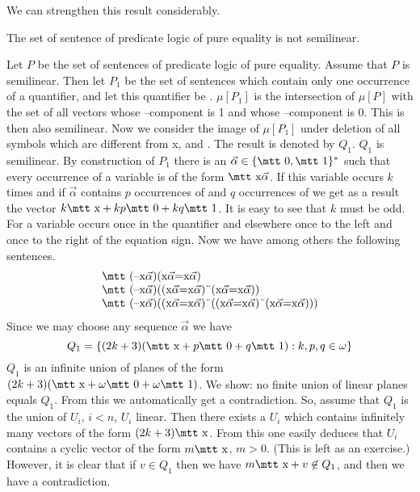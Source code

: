 We can strengthen this result considerably.
\begin{thm}
The set of sentence of predicate logic of pure equality
is not semilinear.
\end{thm}
\proofbeg
Let $P$ be the set of sentences of predicate logic of pure equality.
Assume that $P$ is semilinear. Then let $P_1$ be the set of
sentences which contain only one occurrence of a quantifier,
and let this quantifier be {\mtt{}}. $\mu[P_1]$ is the intersection
of $\mu[P]$ with the set of all vectors whose {\mtt{}}--component
is 1 and whose {\mtt{}}--component is $0$. This is then also
semilinear. Now we consider the image of $\mu[P_1]$ under deletion
of all symbols which are different from {\mtt x}, {}
and {}. The result is denoted by $Q_1$.  $Q_1$ is semilinear.
By construction of $P_1$ there is an $\vec{\alpha} \in \{\mbox{\mtt 0},
\mbox{\mtt 1}\}^{\ast}$ such that every occurrence of a variable is
of the form $\mbox{\mtt x}\vec{\alpha}$. If this variable occurs
$k$ times and if $\vec{\alpha}$ contains $p$ occurrences of
{} and $q$ occurrences of {} we get as a result the
vector $k\mbox{\mtt x} + kp\mbox{\mtt 0} + kq\mbox{\mtt 1}$.
It is easy to see that $k$ must be odd. For a variable occurs
once in the quantifier and elsewhere once to the left and once
to the right of the equation sign. Now we have among others
the following sentences.
\begin{equation}
\begin{array}{l}
\mbox{\mtt (\symbol{21}x$\vec{\alpha}$)(x$\vec{\alpha}$=x$\vec{\alpha}$)} \\
\mbox{\mtt (\symbol{21}x$\vec{\alpha}$)((x$\vec{\alpha}$=x$\vec{\alpha}$)%
\symbol{4}(x$\vec{\alpha}$=x$\vec{\alpha}$))} \\
\mbox{\mtt (\symbol{21}x$\vec{\alpha}$)((x$\vec{\alpha}$=x$\vec{\alpha})$%
\symbol{4}((x$\vec{\alpha}$=x$\vec{\alpha}$)\symbol{4}(x$\vec{\alpha}$%
=x$\vec{\alpha}$)))}
    \end{array}
\end{equation}
Since we may choose any sequence $\vec{\alpha}$ we have
\begin{equation}
Q_1 = \{(2k+3)(\mbox{\mtt x} + p\mbox{\mtt 0} +
q\mbox{\mtt 1}) : k, p, q\in \omega\}
\end{equation}
$Q_1$ is an infinite union of planes of the form
$(2k+3)(\mbox{\mtt x} + \omega\mbox{\mtt 0} + \omega
\mbox{\mtt 1})$. We show: no finite union of linear planes equals
$Q_1$. From this we automatically get a contradiction.
So, assume that $Q_1$ is the union of $U_i$, $i < n$, $U_i$ linear.
Then there exists a $U_i$ which contains infinitely many vectors
of the form $(2k+3)\mbox{\mtt x}$. From this one easily deduces
that $U_i$ contains a cyclic vector of the form $m\mbox{\mtt x}$,
$m > 0$. (This is left as an exercise.) However, it is clear
that if $v \in Q_1$ then we have $m\mbox{\mtt x} + v \not\in Q_1$,
and then we have a contradiction.
\proofend

